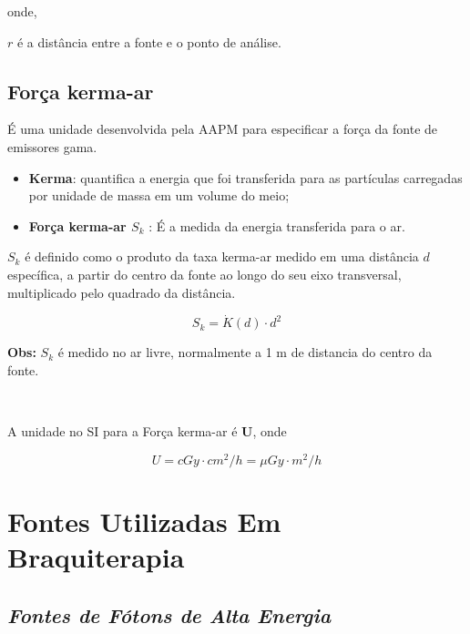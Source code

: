 \documentclass[11pt,a4paper]{article}
\begin{document}
				onde, 

				$r$ é a distância entre a fonte e o ponto de análise.

		\subsection{Força kerma-ar}

			É uma unidade desenvolvida pela AAPM para especificar a força da fonte de emissores gama. 

			\begin{itemize}
				\item \textbf{Kerma}: quantifica a energia que foi transferida para as partículas carregadas por unidade de massa em um volume do meio;
				\item \textbf{Força kerma-ar \textbf{\textit{\textcolor{CarnationPink}{$S_k$}}} }: É a medida da energia transferida para o ar.
			\end{itemize}

			$S_k$ é definido como o produto da taxa kerma-ar medido em uma distância $d$ específica, a partir do centro da fonte ao longo do seu eixo transversal, multiplicado pelo quadrado da distância.

			\begin{equation}
				S_k = \dot{K}(d) \cdot d^2
			\end{equation}

			\textbf{\textcolor{CarnationPink}{Obs:} } $S_k$ é medido no ar livre, normalmente a 1 m de distancia do centro da fonte.

			\

			A unidade no SI para a Força kerma-ar é \textbf{\textcolor{CarnationPink}{U}}, onde


			\begin{equation}
				U = cGy \cdot cm^2 / h = \mu Gy \cdot m^2 / h
			\end{equation}

	\section{Fontes Utilizadas Em Braquiterapia}

		\subsection*{\textbf{\textit{\textcolor{CarnationPink}{Fontes de  Fótons de Alta Energia}}}}
\end{document}
